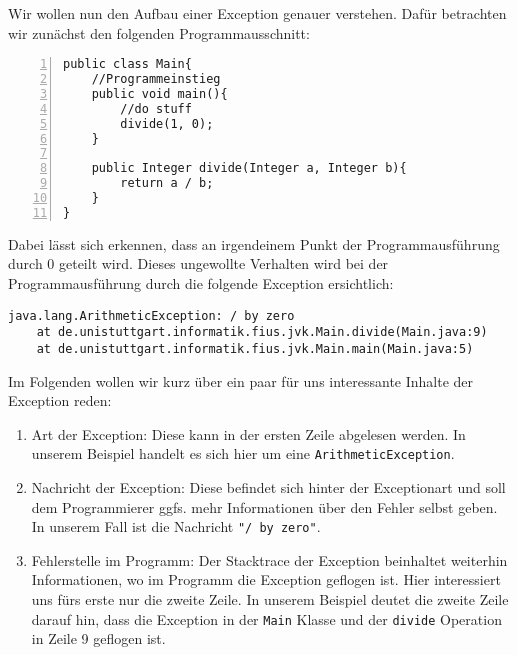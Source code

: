 \begin{Infobox}
    Wir wollen nun den Aufbau einer Exception genauer verstehen. 
    Dafür betrachten wir zunächst den folgenden Programmausschnitt:

    \begin{lstlisting}[numbers=left,xleftmargin=2em,frame=single,framexleftmargin=1.5em]
public class Main{
    //Programmeinstieg
    public void main(){
        //do stuff
        divide(1, 0);
    }
    
    public Integer divide(Integer a, Integer b){
        return a / b;
    }
}
    \end{lstlisting}

    Dabei lässt sich erkennen, dass an irgendeinem Punkt der Programmausführung durch 0 geteilt wird.
    Dieses ungewollte Verhalten wird bei der Programmausführung durch die folgende Exception ersichtlich:

    \begin{lstlisting}[keywords={}, breaklines=true, numbers=none]
java.lang.ArithmeticException: / by zero
    at de.unistuttgart.informatik.fius.jvk.Main.divide(Main.java:9)
    at de.unistuttgart.informatik.fius.jvk.Main.main(Main.java:5)
    \end{lstlisting}    

    Im Folgenden wollen wir kurz über ein paar für uns interessante Inhalte der Exception reden:

    \begin{enumerate}[label=\roman*)]
        \item Art der Exception: Diese kann in der ersten Zeile abgelesen werden. In unserem Beispiel handelt es sich hier um eine \lstinline{ArithmeticException}.
        \item Nachricht der Exception: Diese befindet sich hinter der Exceptionart und soll dem Programmierer ggfs. mehr Informationen über den Fehler selbst geben.
        In unserem Fall ist die Nachricht \lstinline{"/ by zero"}. 
        \item Fehlerstelle im Programm: Der Stacktrace der Exception beinhaltet weiterhin Informationen, wo im Programm die Exception geflogen ist. Hier interessiert uns 
        fürs erste nur die zweite Zeile. In unserem Beispiel deutet die zweite Zeile darauf hin, dass die Exception in der \lstinline{Main} Klasse und der \lstinline{divide}
        Operation in Zeile 9 geflogen ist.
    \end{enumerate}

\end{Infobox}


